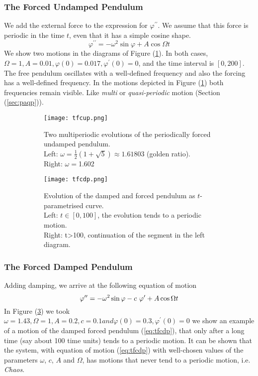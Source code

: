 \subsubsection{The Forced Undamped Pendulum}
We add the external force to the expression for $\varphi^{\prime\prime}$.
We assume that this force is periodic in the time $t$, even that it has a simple cosine shape.
\begin{equation}
	\varphi^{\prime\prime}=-\omega^2\sin\varphi+A\cos\Omega t
\end{equation}
We show two motions in the diagrams of Figure (\ref{fig:tfcup}).
In both cases, $\Omega=1, A=0.01, \varphi(0)=0.017, \varphi^\prime(0)=0$, and the time interval is $[0,200]$.
The free pendulum oscillates with a well-defined frequency and also the forcing has a well-defined frequency.
In the motions depicted in Figure (\ref{fig:tfcup}) both frequencies remain visible. Like \emph{multi} or \emph{quasi}\emph{-periodic} motion (Section (\ref{sec:paqp})). 
\begin{figure}[h!]
	\centering
	\begin{subfigure}{0.45\linewidth}
		\centering
		\texttt{[image: tfcup.png]}
		\caption{Two multiperiodic evolutions of the periodically forced undamped pendulum.\\
		Left: $\omega=\frac{1}{2}(1+\sqrt{5})\approx1.61803$ (golden ratio).\\
		Right: $\omega=$1.602}
		\label{fig:tfcup}
	\end{subfigure}
	\vline
	\begin{subfigure}{0.52\linewidth}
		\centering
		\texttt{[image: tfcdp.png]}
		\caption{Evolution of the damped and forced pendulum as $t$-parametrised curve.\\
		Left: $t\in[0,100]$, the evolution tends to a periodic motion.\\
		Right: t>100, continuation of the segment in the left diagram.}
		\label{fig:tfcdp}
	\end{subfigure}
	\caption{}
\end{figure}
\subsubsection{The Forced Damped Pendulum}
Adding damping, we arrive at the following equation of motion
\begin{equation}{\label{eq:tfcdp}}
	\varphi^{\prime\prime}=-\omega^2\sin\varphi-c\ \varphi^\prime+A\cos\Omega t
\end{equation}
In Figure (\ref{fig:tfcdp}) we took $\omega=1.43, \Omega=1, A=0.2, c=0.1 and \varphi(0)=0.3, \varphi^\prime(0)=0$ we show an example of a motion of the damped forced pendulum (\ref{eq:tfcdp}), that only after a long time (say about 100 time units) tends to a periodic motion. 
It can be shown that the system, with equation of motion (\ref{eq:tfcdp}) with well-chosen values of the parameters $\omega$, $c$, $A$ and $\Omega$, has motions that never tend to a periodic motion, i.e. \emph{Chaos}.